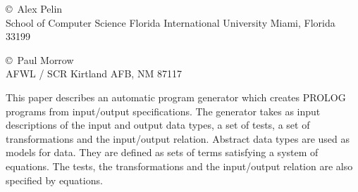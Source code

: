 \label{pelin}\secdown
{}

\copyright\ Alex Pelin\\
School of Computer Science
Florida International University
Miami, Florida 33199
\bigskip

\copyright\ Paul Morrow\\
AFWL / SCR
Kirtland AFB, NM 87117


This paper describes an automatic program generator which creates PROLOG
programs from input/output specifications. The generator takes as input
descriptions of the input and output data types, a set of tests, a set of
transformations and the input/output relation. Abstract data types are used as
models for data. They are defined as sets of terms satisfying a system of
equations. The tests, the transformations and the input/output relation are
also specified by equations.

\secup